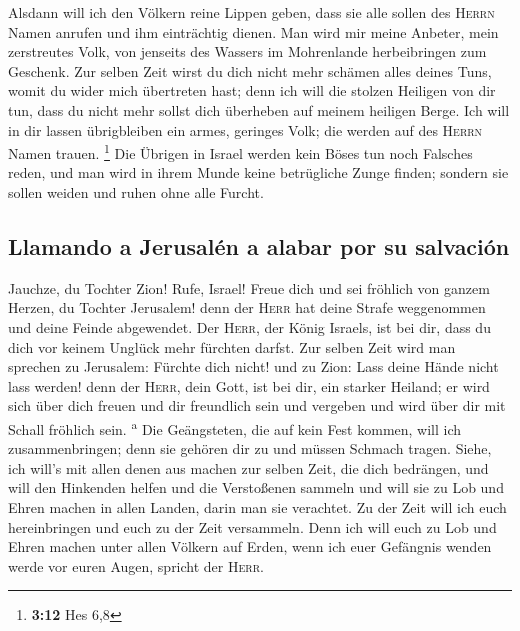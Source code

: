  Alsdann will ich den Völkern reine Lippen geben, dass sie
alle sollen des \textsc{Herrn} Namen anrufen und ihm einträchtig dienen.
 Man wird mir meine Anbeter, mein zerstreutes Volk, von
jenseits des Wassers im Mohrenlande herbeibringen zum Geschenk.
 Zur selben Zeit wirst du dich nicht mehr schämen alles
deines Tuns, womit du wider mich übertreten hast; denn ich will die
stolzen Heiligen von dir tun, dass du nicht mehr sollst dich überheben
auf meinem heiligen Berge.  Ich will in dir lassen
übrigbleiben ein armes, geringes Volk; die werden auf des \textsc{Herrn}
Namen trauen. \footnote{\textbf{3:12} Hes 6,8}  Die
Übrigen in Israel werden kein Böses tun noch Falsches reden, und man
wird in ihrem Munde keine betrügliche Zunge finden; sondern sie sollen
weiden und ruhen ohne alle Furcht.

\hypertarget{llamando-a-jerusaluxe9n-a-alabar-por-su-salvaciuxf3n}{%
\subsection{Llamando a Jerusalén a alabar por su
salvación}\label{llamando-a-jerusaluxe9n-a-alabar-por-su-salvaciuxf3n}}

 Jauchze, du Tochter Zion! Rufe, Israel! Freue dich und
sei fröhlich von ganzem Herzen, du Tochter Jerusalem! 
denn der \textsc{Herr} hat deine Strafe weggenommen und deine Feinde
abgewendet. Der \textsc{Herr}, der König Israels, ist bei dir, dass du
dich vor keinem Unglück mehr fürchten darfst.  Zur selben
Zeit wird man sprechen zu Jerusalem: Fürchte dich nicht! und zu Zion:
Lass deine Hände nicht lass werden!  denn der
\textsc{Herr}, dein Gott, ist bei dir, ein starker Heiland; er wird sich
über dich freuen und dir freundlich sein und vergeben und wird über dir
mit Schall fröhlich sein. \textsuperscript{a}  Die
Geängsteten, die auf kein Fest kommen, will ich zusammenbringen; denn
sie gehören dir zu und müssen Schmach tragen.  Siehe, ich
will's mit allen denen aus machen zur selben Zeit, die dich bedrängen,
und will den Hinkenden helfen und die Verstoßenen sammeln und will sie
zu Lob und Ehren machen in allen Landen, darin man sie verachtet.
 Zu der Zeit will ich euch hereinbringen und euch zu der
Zeit versammeln. Denn ich will euch zu Lob und Ehren machen unter allen
Völkern auf Erden, wenn ich euer Gefängnis wenden werde vor euren Augen,
spricht der \textsc{Herr}.

